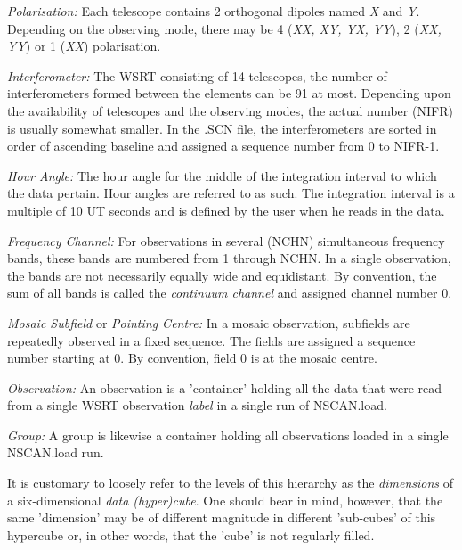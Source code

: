 \bi 
\item   {\em Polarisation:} Each telescope contains 2 orthogonal dipoles named
{\em X} and {\em Y}. Depending on the observing mode, there may be 4 ({\em XX,
XY, YX, YY}), 2 ({\em XX, YY}) or 1 ({\em XX}) polarisation. 

\item   {\em Interferometer:} The WSRT consisting of 14 telescopes, the number
of interferometers formed between the elements can be 91 at most. Depending
upon the availability of telescopes and the observing modes, the actual number
(NIFR) is usually somewhat smaller. In the .SCN file, the interferometers are
sorted in order of ascending baseline and assigned a sequence number from 0 to
NIFR-1. 

\item   {\em Hour Angle:} The hour angle for the middle of the integration
interval to which the data pertain. Hour angles are referred to as such. The
integration interval is a multiple of 10 UT seconds and is defined by the user
when he reads in the data. 

\item   {\em Frequency Channel:} For observations in several (NCHN)
simultaneous frequency bands, these bands are numbered from 1 through NCHN. In
a single observation, the bands are not necessarily equally wide and
equidistant. By convention, the sum of all bands is called the {\em continuum
channel} and assigned channel number 0. 

\item   {\em Mosaic Subfield} or {\em Pointing Centre:} In a mosaic
observation, subfields are repeatedly observed in a fixed sequence. The fields
are assigned a sequence number starting at 0. By convention, field 0 is at the
mosaic centre. 

\item   {\em Observation:} An observation is a 'container' holding all the data
that were read from a single WSRT observation {\em label} in a single run of
NSCAN.load. 

\item   {\em Group:} A group is likewise a container holding all observations
loaded in a single NSCAN.load run. 
\ei 

        It is customary to loosely refer to the levels of this hierarchy as the
{\em dimensions} of a six-dimensional {\em data (hyper)cube}. One should bear
in mind, however, that the same 'dimension' may be of different magnitude in
different 'sub-cubes' of this hypercube or, in other words, that the 'cube' is
not regularly filled. 


